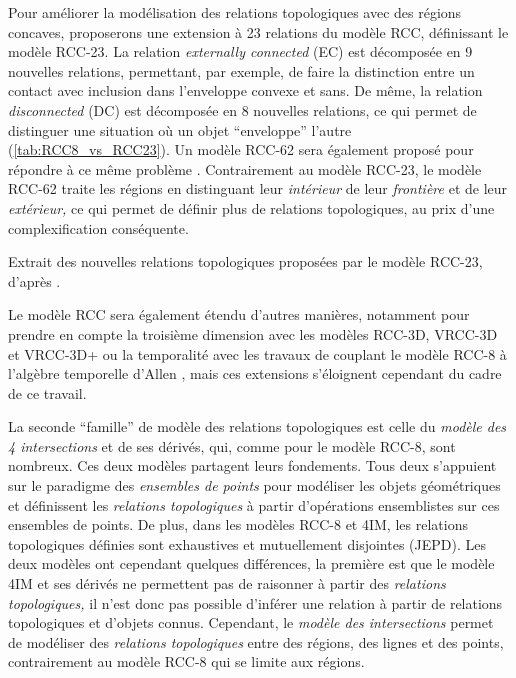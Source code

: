 Pour améliorer la modélisation des relations topologiques avec des
régions concaves, \textcite{Cohn1997} proposerons une extension à 23
relations du modèle RCC, définissant le modèle RCC-23. La relation
\emph{externally connected} (EC) est décomposée en 9 nouvelles
relations, permettant, par exemple, de faire la distinction entre un
contact avec inclusion dans l'enveloppe convexe et sans. De même, la
relation \emph{disconnected} (DC) est décomposée en 8 nouvelles
relations, ce qui permet de distinguer une situation où un objet
\enquote{enveloppe} l'autre (\autoref{tab:RCC8_vs_RCC23}). Un modèle
RCC-62 sera également proposé pour répondre à ce même problème
\autocite{Yang2007}. Contrairement au modèle RCC-23, le modèle RCC-62
traite les régions en distinguant leur \emph{intérieur} de leur
\emph{frontière} et de leur \emph{extérieur,} ce qui permet de définir
plus de relations topologiques, au prix d'une complexification
conséquente.

\begin{table}
  \centering
  
  \caption{Extrait des nouvelles relations topologiques proposées par
    le modèle RCC-23, d'après \textcite{Cohn1997}.}
  \label{tab:RCC8_vs_RCC23}
\end{table}

Le modèle RCC sera également étendu d'autres manières, notamment pour
prendre en compte la troisième dimension avec les modèles RCC-3D,
VRCC-3D et VRCC-3D+ ou la temporalité avec les travaux de
\textcite{XXX} couplant le modèle RCC-8 à l'algèbre temporelle d'Allen
\autocite{Sabharwal2011}, mais ces extensions s'éloignent cependant du
cadre de ce travail.

La seconde \enquote{famille} de modèle des relations topologiques est
celle du \emph{modèle des 4 intersections}
\autocite[4IM,][]{Egenhofer1989} et de ses dérivés, qui, comme pour le
modèle RCC-8, sont nombreux. Ces deux modèles partagent leurs
fondements. Tous deux s’appuient sur le paradigme des \emph{ensembles
  de points} pour modéliser les objets géométriques et définissent les
\emph{relations topologiques} à partir d'opérations ensemblistes sur
ces ensembles de points. De plus, dans les modèles RCC-8
\autocite{Randell1992} et 4IM, les relations topologiques définies
sont exhaustives et mutuellement disjointes (JEPD). Les deux modèles
ont cependant quelques différences, la première est que le modèle 4IM
et ses dérivés ne permettent pas de raisonner à partir des
\emph{relations topologiques,} il n'est donc pas possible d'inférer
une relation à partir de relations topologiques et d'objets
connus. Cependant, le \emph{modèle des intersections} permet de
modéliser des \emph{relations topologiques} entre des régions, des
lignes et des points, contrairement au modèle RCC-8 qui se limite aux
régions.

